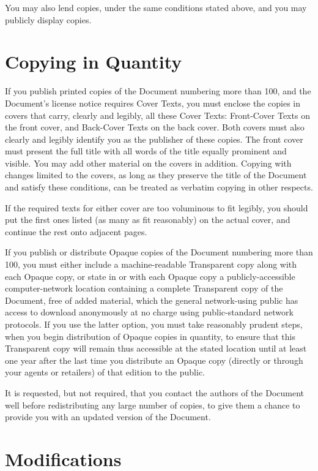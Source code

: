 \documentclass[a4paper,11pt,twoside,dvips]{report}
\begin{document}
You may also lend copies, under the same conditions stated above, and
you may publicly display copies.


\section{Copying in Quantity}

If you publish printed copies of the Document numbering more than 100,
and the Document's license notice requires Cover Texts, you must enclose
the copies in covers that carry, clearly and legibly, all these Cover
Texts: Front-Cover Texts on the front cover, and Back-Cover Texts on
the back cover.  Both covers must also clearly and legibly identify
you as the publisher of these copies.  The front cover must present
the full title with all words of the title equally prominent and
visible.  You may add other material on the covers in addition.
Copying with changes limited to the covers, as long as they preserve
the title of the Document and satisfy these conditions, can be treated
as verbatim copying in other respects.

If the required texts for either cover are too voluminous to fit
legibly, you should put the first ones listed (as many as fit
reasonably) on the actual cover, and continue the rest onto adjacent
pages.

If you publish or distribute Opaque copies of the Document numbering
more than 100, you must either include a machine-readable Transparent
copy along with each Opaque copy, or state in or with each Opaque copy
a publicly-accessible computer-network location containing a complete
Transparent copy of the Document, free of added material, which the
general network-using public has access to download anonymously at no
charge using public-standard network protocols.  If you use the latter
option, you must take reasonably prudent steps, when you begin
distribution of Opaque copies in quantity, to ensure that this
Transparent copy will remain thus accessible at the stated location
until at least one year after the last time you distribute an Opaque
copy (directly or through your agents or retailers) of that edition to
the public.

It is requested, but not required, that you contact the authors of the
Document well before redistributing any large number of copies, to give
them a chance to provide you with an updated version of the Document.


\section{Modifications}
\end{document}
